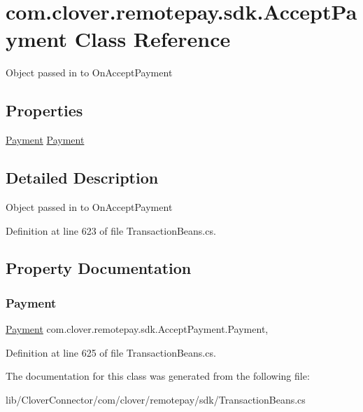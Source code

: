 \hypertarget{classcom_1_1clover_1_1remotepay_1_1sdk_1_1_accept_payment}{}\section{com.\+clover.\+remotepay.\+sdk.\+Accept\+Payment Class Reference}
\label{classcom_1_1clover_1_1remotepay_1_1sdk_1_1_accept_payment}


Object passed in to On\+Accept\+Payment  


\subsection*{Properties}
\begin{DoxyCompactItemize}
\item 
\hyperlink{classcom_1_1clover_1_1sdk_1_1v3_1_1payments_1_1_payment}{Payment} \hyperlink{classcom_1_1clover_1_1remotepay_1_1sdk_1_1_accept_payment_a90d81e3c3167c33629bad34f90560b29}{Payment}
\end{DoxyCompactItemize}


\subsection{Detailed Description}
Object passed in to On\+Accept\+Payment 



Definition at line 623 of file Transaction\+Beans.\+cs.



\subsection{Property Documentation}
\mbox{\label{classcom_1_1clover_1_1remotepay_1_1sdk_1_1_accept_payment_a90d81e3c3167c33629bad34f90560b29}} 
\subsubsection{\texorpdfstring{Payment}{Payment}}
{\footnotesize\ttfamily \hyperlink{classcom_1_1clover_1_1sdk_1_1v3_1_1payments_1_1_payment}{Payment} com.\+clover.\+remotepay.\+sdk.\+Accept\+Payment.\+Payment\hspace{0.3cm}{\ttfamily [get]}, {\ttfamily [set]}}



Definition at line 625 of file Transaction\+Beans.\+cs.



The documentation for this class was generated from the following file\+:\begin{DoxyCompactItemize}
\item 
lib/\+Clover\+Connector/com/clover/remotepay/sdk/Transaction\+Beans.\+cs\end{DoxyCompactItemize}
